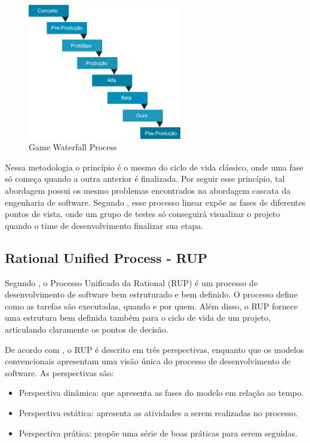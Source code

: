 \documentclass[quali]{ppgccufscar}
\begin{document}
\begin{figure}[!htbp]
	\begin{center}
	\caption{Game Waterfall Process}
	\label{fig_gwp}
	\includegraphics[width=0.6\textwidth,natwidth=598,natheight=528]{figura1.jpg}
\end{center}
\end{figure}

Nessa metodologia o princípio é o mesmo do ciclo de vida clássico, onde uma fase só começa quando a outra anterior é finalizada. Por seguir esse princípio, tal abordagem possui os mesmo problemas encontrados na abordagem cascata da engenharia de software. Segundo , esse processo linear expõe as fases de diferentes pontos de vista, onde um grupo de testes só conseguirá visualizar o projeto quando o time de desenvolvimento finalizar sua etapa.


\subsection{Rational Unified Process - RUP}
\label{sec_rup}

Segundo , o Processo Unificado da Rational (RUP) é um processo de desenvolvimento de software bem estruturado e bem definido. O processo define como as tarefas são executadas, quando e por quem. Além disso, o RUP fornece uma estrutura bem definida também para o ciclo de vida de um projeto, articulando claramente os pontos de decisão.

De acordo com , o RUP é descrito em três perspectivas, enquanto que os modelos convencionais apresentam uma visão única do processo de desenvolvimento de software. As perspectivas são:

\begin{itemize}
	\item Perspectiva dinâmica: que apresenta as fases do modelo em relação ao tempo.
	\item Perspectiva estática: apresenta as atividades a serem realizadas no processo.
	\item Perspectiva prática: propõe uma série de boas práticas para serem seguidas.
\end{itemize}
\end{document}

